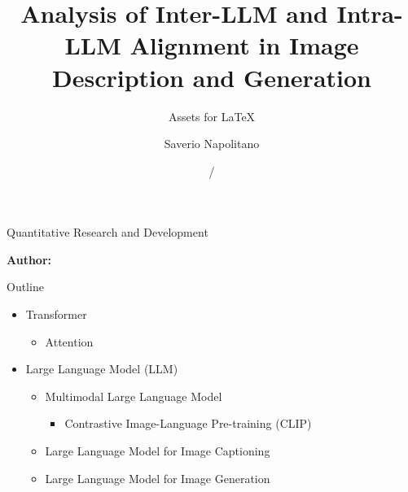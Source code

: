 \documentclass[12pt]{beamer}
\title[Insitute]{Analysis of Inter-LLM and Intra-LLM Alignment in Image Description and Generation}
\subtitle{Assets for \LaTeX}
\author[Name Surname]{Saverio Napolitano}
\institute[]{Mid Sweden University}
\date{\currentyear/\nextyear} %
\newcommand{\course}{Quantitative Research and Development}
\begin{document}
\begin{frame}{}


\vspace{\fill}

\Large
\color{main}
\inserttitle

\medskip

\large
\color{black}

\vspace{\fill}

\footnotesize
\insertinstitute

\footnotesize
\course


\vspace{\fill}

\textbf{Author:} \insertauthor

\medskip

\insertdate

\vspace{\fill}
\end{frame}

\begin{frame}[allowframebreaks]{Outline}
\begin{itemize}
    \item Transformer 
    \begin{itemize}
        \item Attention
    \end{itemize} 
    \item Large Language Model (LLM)
    \begin{itemize}
        \item Multimodal Large Language Model 
        \begin{itemize} 
            \item Contrastive Image-Language Pre-training (CLIP)
        \end{itemize}
        \item Large Language Model for Image Captioning 
        \item Large Language Model for Image Generation 
    \end{itemize}
\end{itemize}
\end{frame} 
\end{document}
